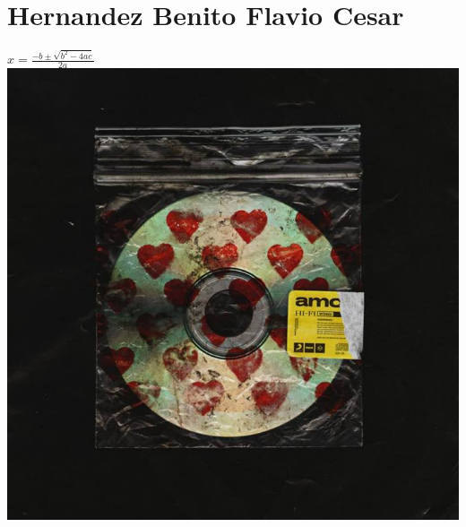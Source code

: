 \chapter{Hernandez Benito Flavio Cesar}
$x= \frac{-b \pm \sqrt{b^2-4ac}}{2a}$
\\
\includegraphics{./317058637/amo.jpg}
